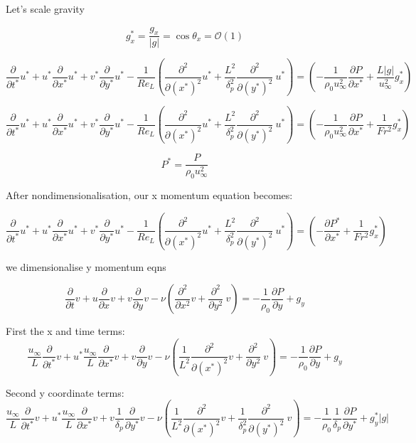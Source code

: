 \documentclass[11pt]{article}
\begin{document}
Let's scale gravity

$$g_x^* = \frac{g_x}{|g|} = \cos \theta_x = \mathcal{O}(1)$$


$$\frac{\partial }{\partial t^*} u^* + u^*  \frac{\partial}{\partial x^* } u^* + v^*  \frac{\partial}{\partial y^*} u^* - \frac{1}{Re_L}  ( \frac{\partial^2}{\partial (x^*)^2} u^* + \frac{L^2}{\delta_p^2} \frac{\partial^2}{\partial (y^*)^2} \ u^* ) =  ( -  \frac{1}{ \rho_0 u_\infty^2} \frac{\partial P}{\partial x^*} + \frac{L |g|}{u_\infty^2}g_x^* )$$


$$\frac{\partial }{\partial t^*} u^* + u^*  \frac{\partial}{\partial x^* } u^* + v^*  \frac{\partial}{\partial y^*} u^* - \frac{1}{Re_L}  ( \frac{\partial^2}{\partial (x^*)^2} u^* + \frac{L^2}{\delta_p^2} \frac{\partial^2}{\partial (y^*)^2} \ u^* ) =  ( -  \frac{1}{ \rho_0 u_\infty^2} \frac{\partial P}{\partial x^*} + \frac{1}{Fr^2}g_x^* )$$


$$P^* = \frac{P}{\rho_0 u_\infty^2}$$

After nondimensionalisation, our x momentum equation becomes:

$$\frac{\partial }{\partial t^*} u^* + u^*  \frac{\partial}{\partial x^* } u^* + v^*  \frac{\partial}{\partial y^*} u^* - \frac{1}{Re_L}  ( \frac{\partial^2}{\partial (x^*)^2} u^* + \frac{L^2}{\delta_p^2} \frac{\partial^2}{\partial (y^*)^2} \ u^* ) =  ( -  \frac{\partial P^*}{\partial x^*} + \frac{1}{Fr^2}g_x^* )$$

we dimensionalise y momentum eqns

$$\frac{\partial }{\partial t} v + u \frac{\partial}{\partial x} v + v \frac{\partial}{\partial y} v - \nu ( \frac{\partial^2}{\partial x^2} v + \frac{\partial^2}{\partial y^2} \ v ) = - \frac{1}{\rho_0} \frac{\partial P}{\partial y} +g_y$$

First the x and time terms:
$$ \frac{u_\infty}{L} \frac{\partial }{\partial t^*} v + u^* \frac{u_\infty}{L} \frac{\partial}{\partial x^*} v + v \frac{\partial}{\partial y} v - \nu (\frac{1}{L^2} \frac{\partial^2}{\partial (x^*)^2} v + \frac{\partial^2}{\partial y^2} \ v ) = - \frac{1}{\rho_0} \frac{\partial P}{\partial y} +g_y$$

Second y coordinate terms:
$$ \frac{u_\infty}{L} \frac{\partial }{\partial t^*} v + u^* \frac{u_\infty}{L} \frac{\partial}{\partial x^*} v + v \frac{1}{\delta_p} \frac{\partial}{\partial y^*} v - \nu (\frac{1}{L^2} \frac{\partial^2}{\partial (x^*)^2} v + \frac{1}{\delta_p^2} \frac{\partial^2}{\partial (y^*)^2} \ v ) = - \frac{1}{\rho_0} \frac{1}{\delta_p} \frac{\partial P}{\partial y^*} +g_y^*|g|$$
\end{document}
